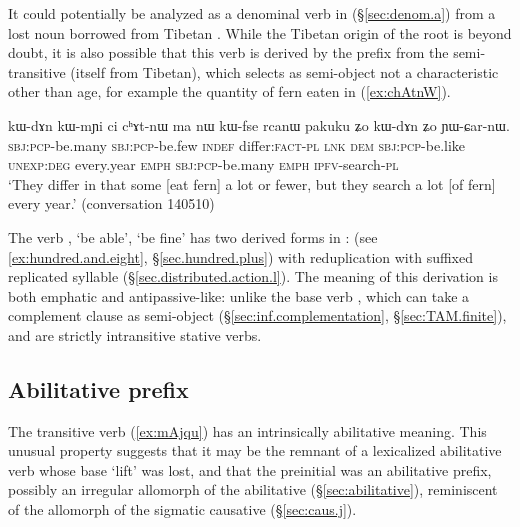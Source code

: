 It could potentially be analyzed as a denominal verb in  (§\ref{sec:denom.a}) from a lost noun  borrowed from Tibetan . While the Tibetan origin of the root is beyond doubt, it is also possible that this verb is derived by the  prefix from the semi-transitive  (itself from Tibetan), which selects as semi-object not a characteristic other than age, for example the quantity of fern eaten in (\ref{ex:chAtnW}).

\begin{exe}
\ex \label{ex:chAtnW} 
\gll kɯ-dɤn kɯ-mɲi ci cʰɤt-nɯ ma nɯ kɯ-fse rcanɯ pakuku ʑo kɯ-dɤn ʑo ɲɯ-ɕar-nɯ.  \\
\textsc{sbj}:\textsc{pcp}-be.many \textsc{sbj}:\textsc{pcp}-be.few \textsc{indef} differ:\textsc{fact}-\textsc{pl} \textsc{lnk} \textsc{dem} \textsc{sbj}:\textsc{pcp}-be.like \textsc{unexp}:\textsc{deg} every.year \textsc{emph} \textsc{sbj}:\textsc{pcp}-be.many \textsc{emph} \textsc{ipfv}-search-\textsc{pl} \\
\glt `They differ in that some [eat fern] a lot or fewer, but they search a lot [of fern] every year.' (conversation 140510)
\end{exe}

The verb , `be able', `be fine' has two derived forms in :  (see \ref{ex:hundred.and.eight}, §\ref{sec.hundred.plus}) with reduplication  with suffixed  replicated syllable (§\ref{sec.distributed.action.l}). The meaning of this derivation is both emphatic and antipassive-like: unlike the base verb , which can take a complement clause as semi-object (§\ref{sec:inf.complementation}, §\ref{sec:TAM.finite}),  and  are strictly intransitive stative verbs.

\subsection{Abilitative  prefix  } \label{sec:j.abilitative}
The transitive verb  (\ref{ex:mAjqu}) has an intrinsically abilitative meaning. This unusual property suggests that it may be the remnant of a lexicalized abilitative verb whose base  `lift' was lost, and that the  preinitial was an abilitative prefix, possibly an irregular allomorph of the  abilitative (§\ref{sec:abilitative}), reminiscent of the  allomorph of the sigmatic causative (§\ref{sec:caus.j}).

